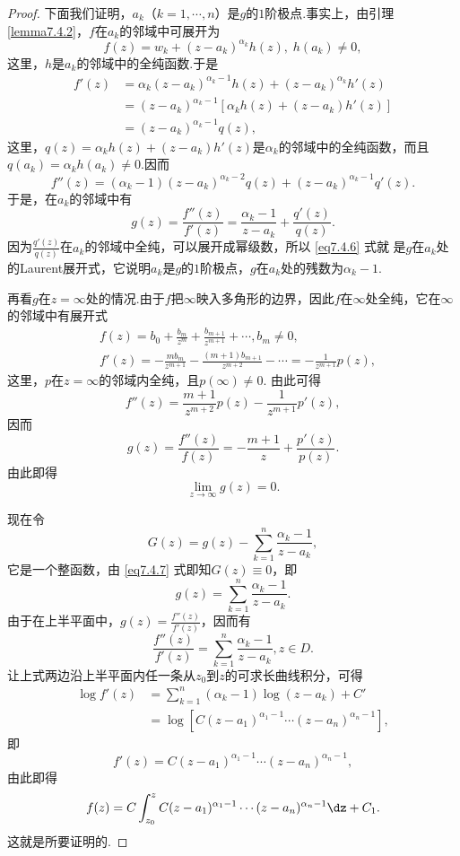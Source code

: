 \begin{proof}
下面我们证明，$a_k$（$k=1,\cdots,n$）是$g$的$1$阶极点.事实上，由引理 \ref{lemma7.4.2}，$f$在$a_k$的邻域中可展开为
\[f(z)=w_k+(z-a_k)^{\alpha_k}h(z),\;h(a_k)\ne0,\]
这里，$h$是$a_k$的邻域中的全纯函数.于是
\begin{align*}
f'(z)&=\alpha_k(z-a_k)^{\alpha_k-1}h(z)+(z-a_k)^{\alpha_k}h'(z)\\
&=(z-a_k)^{\alpha_k-1}[\alpha_kh(z)+(z-a_k)h'(z)]\\
&=(z-a_k)^{\alpha_k-1}q(z),
\end{align*}
这里，$q(z)=\alpha_kh(z)+(z-a_k)h'(z)$是$\alpha_k$的邻域中的全纯函数，而且$q(a_k)=\alpha_kh(a_k)\ne0$.因而
\[f''(z)=(\alpha_k-1)(z-a_k)^{\alpha_k-2}q(z)+(z-a_k)^{\alpha_k-1}q'(z).\]
于是，在$a_k$的邻域中有
\begin{equation}\label{eq7.4.6}
g(z)=\frac{f''(z)}{f'(z)}=\frac{\alpha_k-1}{z-a_k}+\frac{q'(z)}{q(z)}.
\end{equation}
因为$\frac{q'(z)}{q(z)}$在$a_k$的邻域中全纯，可以展开成幂级数，所以 \eqref{eq7.4.6} 式就
是$g$在$a_k$处的Laurent展开式，它说明$a_k$是$g$的$1$阶极点，$g$在$a_k$处的残数为$\alpha_k-1$.

再看$g$在$z=\infty$处的情况.由于$f$把$\infty$映入多角形的边界，因此$f$在$\infty$处全纯，它在$\infty$的邻域中有展开式
\begin{align*}
&f(z)=b_0+\frac{b_m}{z^m}+\frac{b_{m+1}}{z^{m+1}}+\cdots,b_m\ne0,\\
&f'(z)=-\frac{mb_m}{z^{m+1}}-\frac{(m+1)b_{m+1}}{z^{m+2}}-\cdots=-\frac1{z^{m+1}}p(z),
\end{align*}
这里，$p$在$z=\infty$的邻域内全纯，且$p(\infty)\ne0$. 由此可得
\[f''(z)=\frac{m+1}{z^{m+2}}p(z)-\frac1{z^{m+1}}p'(z),\]
因而
\[g(z)=\frac{f''(z)}{f(z)}=-\frac{m+1}z+\frac{p'(z)}{p(z)}.\]
由此即得
\begin{equation}\label{eq7.4.7}
\lim_{z\to\infty}g(z)=0.
\end{equation}

现在令
\[G(z)=g(z)-\sum_{k=1}^n\frac{\alpha_k-1}{z-a_k},\]
它是一个整函数，由 \eqref{eq7.4.7} 式即知$G(z)\equiv0$，即
\[g(z)=\sum_{k=1}^n\frac{\alpha_k-1}{z-a_k}.\]
由于在上半平面中，$g(z)=\frac{f''(z)}{f'(z)}$，因而有
\[\frac{f''(z)}{f'(z)}=\sum_{k=1}^n\frac{\alpha_k-1}{z-a_k},z\in D.\]
让上式两边沿上半平面内任一条从$z_0$到$z$的可求长曲线积分，可得
\begin{align*}
\log f'(z)&=\sum_{k=1}^n(\alpha_k-1)\log(z-a_k)+C'\\
&=\log[C(z-a_1)^{\alpha_1-1}\cdots(z-a_n)^{\alpha_n-1}],
\end{align*}
即
\[f'(z)=C(z-a_1)^{\alpha_1-1}\cdots(z-a_n)^{\alpha_n-1},\]
由此即得
\[f(z)=C\int_{z_0}^zC(z-a_1)^{\alpha_1-1}\cdots(z-a_n)^{\alpha_n-1}\dz+C_1.\]
这就是所要证明的.
\end{proof}

